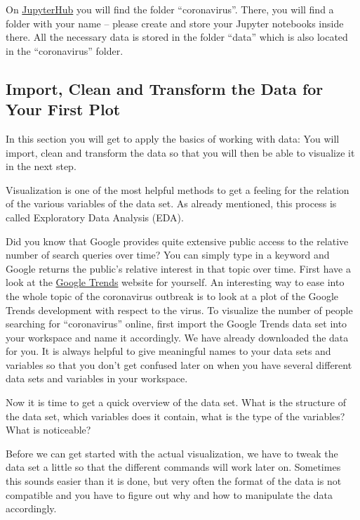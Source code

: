 \documentclass[
  11pt,
]{article}
\newenvironment{tipsp}[1]
  {
  \begin{itemize}
  \footnotesize
  \renewcommand{\labelitemi}{
    \raisebox{-.7\height}[0pt][0pt]{
      {\setkeys{Gin}{width=3em,keepaspectratio}
        \texttt{[image: images/\#1.png]}}
    }
  }
  \setlength{\fboxsep}{1em}
  \begin{pbox}
  \item
  }
  {
  \end{pbox}
  \end{itemize}
  }
\begin{document}
\begin{tipsp}p

On \href{http://tech-academy.io/jupyter}{JupyterHub} you will find the folder ``coronavirus''. There, you will find a folder with your name -- please create and store your Jupyter notebooks inside there.
All the necessary data is stored in the folder ``data'' which is also located in the ``coronavirus'' folder.

\end{tipsp}

\hypertarget{import-clean-and-transform-the-data-for-your-first-plot}{%
\subsection{Import, Clean and Transform the Data for Your First Plot}\label{import-clean-and-transform-the-data-for-your-first-plot}}

In this section you will get to apply the basics of working with data: You will import, clean and transform the data so that you will then be able to visualize it in the next step.

Visualization is one of the most helpful methods to get a feeling for the relation of the various variables of the data set. As already mentioned, this process is called Exploratory Data Analysis (EDA).

Did you know that Google provides quite extensive public access to the relative number of search queries over time? You can simply type in a keyword and Google returns the public's relative interest in that topic over time. First have a look at the \href{https://trends.google.de/trends}{Google Trends} website for yourself. An interesting way to ease into the whole topic of the coronavirus outbreak is to look at a plot of the Google Trends development with respect to the virus. To visualize the number of people searching for ``coronavirus'' online, first import the Google Trends data set into your workspace and name it accordingly. We have already downloaded the data for you. It is always helpful to give meaningful names to your data sets and variables so that you don't get confused later on when you have several different data sets and variables in your workspace.

Now it is time to get a quick overview of the data set. What is the structure of the data set, which variables does it contain, what is the type of the variables? What is noticeable?

Before we can get started with the actual visualization, we have to tweak the data set a little so that the different commands will work later on. Sometimes this sounds easier than it is done, but very often the format of the data is not compatible and you have to figure out why and how to manipulate the data accordingly.
\end{document}
